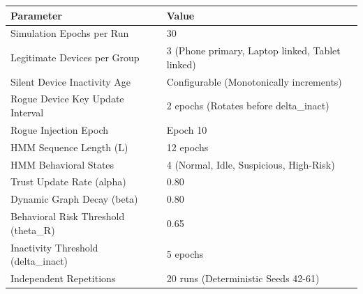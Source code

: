 \begin{tabular}{ll}
\toprule
Parameter & Value \\
\midrule
Simulation Epochs per Run & 30 \\
Legitimate Devices per Group & 3 (Phone primary, Laptop linked, Tablet linked) \\
Silent Device Inactivity Age & Configurable (Monotonically increments) \\
Rogue Device Key Update Interval & 2 epochs (Rotates before delta_inact) \\
Rogue Injection Epoch & Epoch 10 \\
HMM Sequence Length (L) & 12 epochs \\
HMM Behavioral States & 4 (Normal, Idle, Suspicious, High-Risk) \\
Trust Update Rate (alpha) & 0.80 \\
Dynamic Graph Decay (beta) & 0.80 \\
Behavioral Risk Threshold (theta_R) & 0.65 \\
Inactivity Threshold (delta_inact) & 5 epochs \\
Independent Repetitions & 20 runs (Deterministic Seeds 42-61) \\
\bottomrule
\end{tabular}
